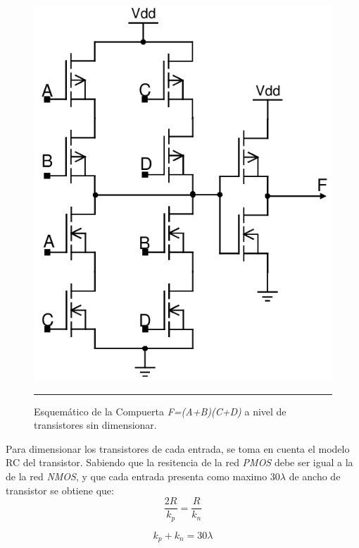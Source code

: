 \documentclass[12pt,a4paper]{article} %
\begin{document}
\begin{figure}[htbp]
  \centering
    \includegraphics[scale=0.45]{./Comp_Transistores.png}
    \rule{35em}{0.5pt}
  \caption[IdealvsSim]{Esquemático de la Compuerta \textit{F=(A+B)(C+D)} a nivel de transistores sin dimensionar.}
  \label{fig:Comp_Transistores}
\end{figure}

Para dimensionar los transistores de cada entrada, se toma en cuenta el modelo RC del transistor. Sabiendo que la resitencia de la red \textit{PMOS} debe ser igual a la de la red \textit{NMOS}, y que cada entrada presenta como maximo 30$\lambda$ de ancho de transistor se obtiene que:\\

\begin{equation}\label{eqn:R}
\frac{2R}{k_p} = \frac{R}{k_n}
\end{equation}

\begin{equation}\label{eqn:k}
k_p + k_n = 30\lambda
\end{equation}\\
\end{document}
